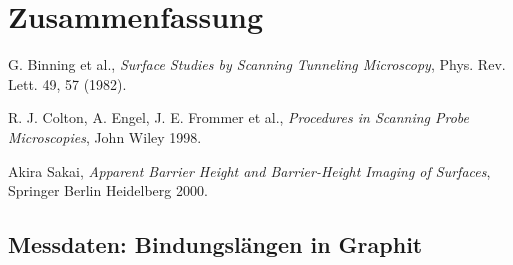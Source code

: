 \documentclass[10pt, a4paper]{article}
\begin{document}
\section{Zusammenfassung}


\begin{thebibliography}{9}

  G. Binning et al.,
  \emph{Surface Studies by Scanning Tunneling Microscopy},
  Phys. Rev. Lett. 49, 57 (1982).

  R. J. Colton, A. Engel, J. E. Frommer et al.,
  \emph{Procedures in Scanning Probe Microscopies},
  John Wiley 1998.

  Akira Sakai,
  \emph{Apparent Barrier Height and Barrier-Height Imaging of Surfaces},
  Springer Berlin Heidelberg 2000.
  
\end{thebibliography}

\newpage

\begin{appendix}
\section{Messdaten: Bindungslängen in Graphit}
\label{messw:laenge}


\end{appendix}
\end{document}
